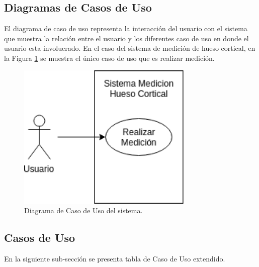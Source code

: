 \subsection{Diagramas de Casos de Uso}
\label{ssc:DCU}

El diagrama de caso de uso representa la interacción del usuario con el sistema que muestra la relación entre el usuario y los diferentes caso de uso en donde el usuario esta involucrado. En el caso del sistema de medición de hueso cortical, en la Figura \ref{fig:dcu} se muestra el único caso de uso que es realizar medición.

\begin{figure}[H]
    \centering
    \includegraphics[width=0.75\textwidth]{imagenes/diagrama-caso-usos.png}
    \caption{Diagrama de Caso de Uso del sistema.}
    \label{fig:dcu}
\end{figure}

\subsection{Casos de Uso}
\label{ssc:CU}


En la siguiente sub-sección se presenta tabla de Caso de Uso extendido.


